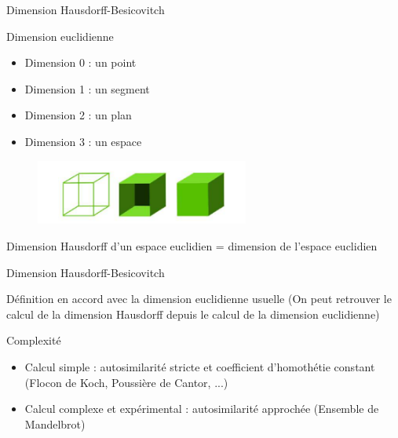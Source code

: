 \documentclass{beamer}
\begin{document}
\begin{frame}{Dimension Hausdorff-Besicovitch}
\begin{block}{Dimension euclidienne}
    \begin{itemize}
        \item Dimension 0 : un point
        \item Dimension 1 : un segment
        \item Dimension 2 : un plan
        \item Dimension 3 : un espace
    \end{itemize}
\end{block}
     \begin{figure}[H]
        \centering
        \includegraphics[width=70mm]{Dimension.PNG}
 \end{figure}
 \begin{block}{}
Dimension Hausdorff d'un espace euclidien = dimension de l'espace euclidien
\end{block}
\end{frame}

\begin{frame}{Dimension Hausdorff-Besicovitch}
\begin{block}{}
Définition en accord avec la dimension euclidienne usuelle (On peut retrouver le calcul de la dimension Hausdorff depuis le calcul de la dimension euclidienne)
\end{block}

 \begin{block}{Complexité}
    \begin{itemize}
        \item Calcul simple : autosimilarité stricte et coefficient d'homothétie constant (Flocon de Koch, Poussière de Cantor, ...)
        \item Calcul complexe et expérimental : autosimilarité approchée (Ensemble de Mandelbrot)
    \end{itemize}
\end{block}
\end{frame}
\end{document}
